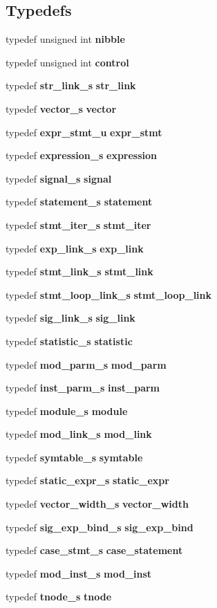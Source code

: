 \subsection*{Typedefs}
\begin{CompactItemize}
\item 
typedef unsigned int {\bf nibble}
\item 
typedef unsigned int {\bf control}
\item 
typedef {\bf str\_\-link\_\-s} {\bf str\_\-link}
\item 
typedef {\bf vector\_\-s} {\bf vector}
\item 
typedef {\bf expr\_\-stmt\_\-u} {\bf expr\_\-stmt}
\item 
typedef {\bf expression\_\-s} {\bf expression}
\item 
typedef {\bf signal\_\-s} {\bf signal}
\item 
typedef {\bf statement\_\-s} {\bf statement}
\item 
typedef {\bf stmt\_\-iter\_\-s} {\bf stmt\_\-iter}
\item 
typedef {\bf exp\_\-link\_\-s} {\bf exp\_\-link}
\item 
typedef {\bf stmt\_\-link\_\-s} {\bf stmt\_\-link}
\item 
typedef {\bf stmt\_\-loop\_\-link\_\-s} {\bf stmt\_\-loop\_\-link}
\item 
typedef {\bf sig\_\-link\_\-s} {\bf sig\_\-link}
\item 
typedef {\bf statistic\_\-s} {\bf statistic}
\item 
typedef {\bf mod\_\-parm\_\-s} {\bf mod\_\-parm}
\item 
typedef {\bf inst\_\-parm\_\-s} {\bf inst\_\-parm}
\item 
typedef {\bf module\_\-s} {\bf module}
\item 
typedef {\bf mod\_\-link\_\-s} {\bf mod\_\-link}
\item 
typedef {\bf symtable\_\-s} {\bf symtable}
\item 
typedef {\bf static\_\-expr\_\-s} {\bf static\_\-expr}
\item 
typedef {\bf vector\_\-width\_\-s} {\bf vector\_\-width}
\item 
typedef {\bf sig\_\-exp\_\-bind\_\-s} {\bf sig\_\-exp\_\-bind}
\item 
typedef {\bf case\_\-stmt\_\-s} {\bf case\_\-statement}
\item 
typedef {\bf mod\_\-inst\_\-s} {\bf mod\_\-inst}
\item 
typedef {\bf tnode\_\-s} {\bf tnode}
\end{CompactItemize}
